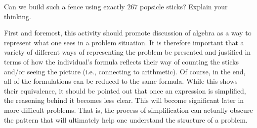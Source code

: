 \documentclass[nooutcomes,noauthor,handout]{ximera}
\begin{document}
\begin{problem}
Can we build such a fence using exactly $267$ popsicle sticks? Explain your thinking.
\end{problem}


\newpage
\begin{instructorNotes}

First and foremost, this activity should promote discussion of algebra as a way to represent what one sees in a problem situation. It is therefore important that a variety of different ways of representing the problem be presented and justified in terms of how the individual's formula reflects their way of counting the sticks and/or seeing the picture (i.e., connecting to arithmetic). Of course, in the end, all of the formulations can be reduced to the same formula. While this shows their equivalence, it should be pointed out that once an expression is simplified, the reasoning behind it becomes less clear. This will become significant later in more difficult problems. That is, the process of simplification can actually obscure the pattern that will ultimately help one understand the structure of a problem.


\end{instructorNotes}
\end{document}
